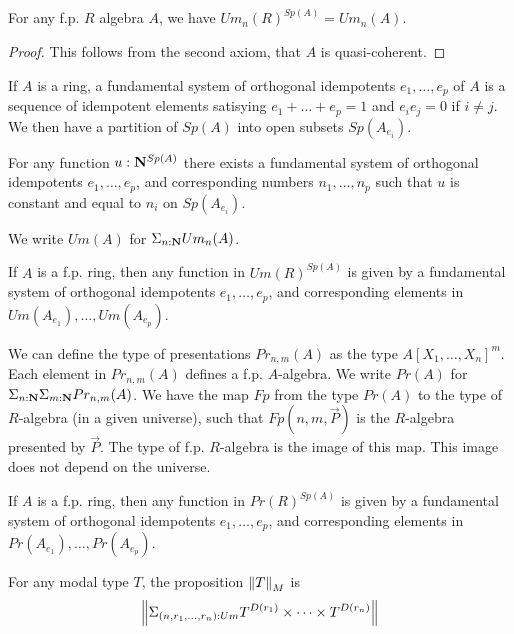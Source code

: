    \begin{lemma}\label{Um}
      For any f.p. $R$ algebra $A$, we have $Um_n(R)^{Sp(A)} = Um_n(A)$.
    \end{lemma}

    \begin{proof}
      This follows from the second axiom, that $A$ is quasi-coherent.
    \end{proof}

    If $A$ is a ring, a fundamental system of orthogonal idempotents $e_1,\dots,e_p$ of $A$ is a sequence of 
    idempotent elements satisying $e_1+\dots+e_p = 1$ and $e_ie_j = 0$ if $i\neq j$. We then have a partition
    of $Sp(A)$ into open subsets $Sp(A_{e_i})$.

    \begin{lemma}\label{nats}
      For any function $u:\mathbf{N}^{Sp(A)}$ there exists a fundamental system of orthogonal idempotents $e_1,\dots,e_p$, and corresponding
      numbers $n_1,\dots,n_p$ such that $u$ is constant and equal to $n_i$ on $Sp(A_{e_i})$.
    \end{lemma}

    We write $Um(A)$ for $\Sigma_{n:\mathbf{N}}Um_n(A)$.

    \begin{corollary}
      If $A$ is a f.p. ring, then any function in $Um(R)^{Sp(A)}$ is given by
      a fundamental system of orthogonal idempotents $e_1,\dots,e_p$, and corresponding elements in $Um(A_{e_1}),\dots,Um(A_{e_p})$.
    \end{corollary}
    
    We can define the type of presentations $Pr_{n,m}(A)$ as the type $A[X_1,\dots,X_n]^m$. Each element in $Pr_{n,m}(A)$ defines a
    f.p. $A$-algebra. We write $Pr(A)$ for $\Sigma_{n:\mathbf{N}}\Sigma_{m:\mathbf{N}}Pr_{n,m}(A)$. We have the map
    $Fp$ from the type $Pr(A)$ to the type of $R$-algebra (in a given universe), such that $Fp(n,m,\vec{P})$ is the $R$-algebra
    presented by $\vec{P}$. The type of f.p. $R$-algebra is the image of this map. This image does not depend on the universe.

    \begin{corollary}
      If $A$ is a f.p. ring, then any function in $Pr(R)^{Sp(A)}$ is given by
      a fundamental system of orthogonal idempotents $e_1,\dots,e_p$, and corresponding elements in $Pr(A_{e_1}),\dots,Pr(A_{e_p})$.
    \end{corollary}
    
    \begin{proposition}\label{norm}
      For any modal type $T$, the proposition $\left\lVert T \right\rVert_M$ is
      $$\left\lVert \Sigma_{(n,r_1,\dots,r_n):Um}T^{D(r_1)}\times\dots\times T^{D(r_n)} \right\rVert$$
    \end{proposition}
    
